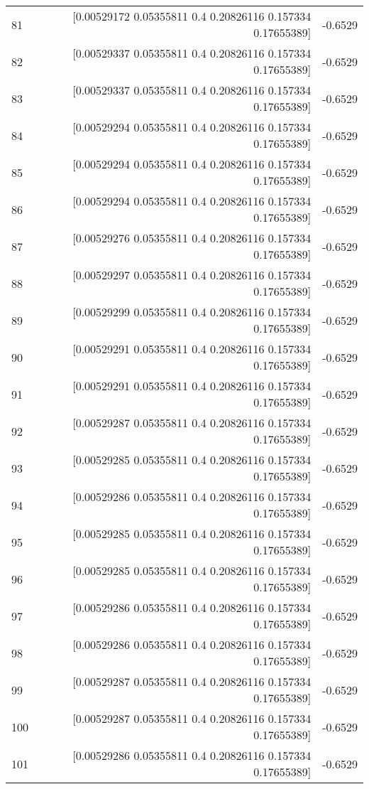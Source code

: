 \begin{longtable}{lrr}
81 & [0.00529172 0.05355811 0.4        0.20826116 0.157334   0.17655389] & -0.6529 \\
82 & [0.00529337 0.05355811 0.4        0.20826116 0.157334   0.17655389] & -0.6529 \\
83 & [0.00529337 0.05355811 0.4        0.20826116 0.157334   0.17655389] & -0.6529 \\
84 & [0.00529294 0.05355811 0.4        0.20826116 0.157334   0.17655389] & -0.6529 \\
85 & [0.00529294 0.05355811 0.4        0.20826116 0.157334   0.17655389] & -0.6529 \\
86 & [0.00529294 0.05355811 0.4        0.20826116 0.157334   0.17655389] & -0.6529 \\
87 & [0.00529276 0.05355811 0.4        0.20826116 0.157334   0.17655389] & -0.6529 \\
88 & [0.00529297 0.05355811 0.4        0.20826116 0.157334   0.17655389] & -0.6529 \\
89 & [0.00529299 0.05355811 0.4        0.20826116 0.157334   0.17655389] & -0.6529 \\
90 & [0.00529291 0.05355811 0.4        0.20826116 0.157334   0.17655389] & -0.6529 \\
91 & [0.00529291 0.05355811 0.4        0.20826116 0.157334   0.17655389] & -0.6529 \\
92 & [0.00529287 0.05355811 0.4        0.20826116 0.157334   0.17655389] & -0.6529 \\
93 & [0.00529285 0.05355811 0.4        0.20826116 0.157334   0.17655389] & -0.6529 \\
94 & [0.00529286 0.05355811 0.4        0.20826116 0.157334   0.17655389] & -0.6529 \\
95 & [0.00529285 0.05355811 0.4        0.20826116 0.157334   0.17655389] & -0.6529 \\
96 & [0.00529285 0.05355811 0.4        0.20826116 0.157334   0.17655389] & -0.6529 \\
97 & [0.00529286 0.05355811 0.4        0.20826116 0.157334   0.17655389] & -0.6529 \\
98 & [0.00529286 0.05355811 0.4        0.20826116 0.157334   0.17655389] & -0.6529 \\
99 & [0.00529287 0.05355811 0.4        0.20826116 0.157334   0.17655389] & -0.6529 \\
100 & [0.00529287 0.05355811 0.4        0.20826116 0.157334   0.17655389] & -0.6529 \\
101 & [0.00529286 0.05355811 0.4        0.20826116 0.157334   0.17655389] & -0.6529 \\

\end{longtable}
